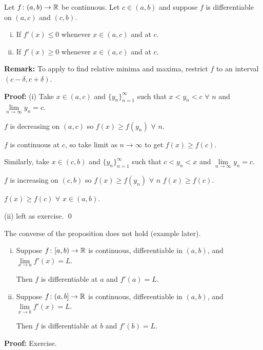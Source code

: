 \documentclass[10pt,aspectratio=169]{beamer}
\begin{document}
\begin{frame}

\begin{proposition}
Let $f \colon (a,b) \to {\mathbb{R}}$ be continuous.  Let $c \in (a,b)$
and suppose
$f$ is differentiable on $(a,c)$ and $(c,b)$.
\begin{enumerate}[(i)]
\item If $f'(x) \leq 0$ whenever $x \in (a,c)$ and
at $c$.
\item If $f'(x) \geq 0$ whenever $x \in (a,c)$ and
at $c$.
\end{enumerate}
\end{proposition}

\pause
\textbf{Remark:}
To apply to find relative minima
and maxima, restrict $f$ to an interval $(c-\delta,c+\delta)$.

\medskip
\pause

\textbf{Proof:}
(i)
Take $x \in (a,c)$ and $\{ y_n\}_{n=1}^\infty$ such that $x < y_n < c$
$\forall$ $n$
and $\lim\limits_{n\to\infty} y_n = c$.
\pause

$f$ is decreasing on $(a,c)$ so $f(x) \geq f(y_n)$ $\forall$ $n$.
\pause

$f$ is continuous at $c$, so take limit as $n \to \infty$ to get
$f(x) \geq f(c)$.

\medskip
\pause

Similarly, take $x \in (c,b)$
and $\{ y_n\}_{n=1}^\infty$ such that $c < y_n < x$ and
$\lim\limits_{n\to\infty} y_n = c$.
\pause

$f$ is increasing on $(c,b)$ so $f(x) \geq f(y_n)$ $\forall$ $n$
\pause
\wthus
$f(x) \geq f(c)$.

\medskip
\pause

\thus \quad
$f(x) \geq f(c)$ $\forall$
$x \in (a,b)$.

\medskip
\pause

(ii) left as exercise.
\qed

\medskip
\pause
The converse of the proposition does not hold (example later).
\end{frame}

\begin{frame}

\begin{proposition}
\begin{enumerate}[(i)]
\item
\pause
Suppose $f \colon [a,b) \to {\mathbb{R}}$ is continuous, differentiable in $(a,b)$,
and $\lim\limits_{x \to a} f'(x) = L$.

\pause
Then $f$ is differentiable at $a$ and $f'(a) = L$.
\item
\pause
Suppose $f \colon (a,b] \to {\mathbb{R}}$ is continuous, differentiable in $(a,b)$,
and $\lim\limits_{x \to b} f'(x) = L$.

\pause
Then $f$ is differentiable at $b$ and $f'(b) = L$.
\end{enumerate}
\end{proposition}

\pause
\textbf{Proof:} Exercise.

\end{frame}
\end{document}
